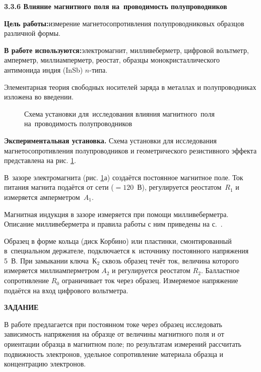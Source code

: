 {\large \bf 3.3.6 Влияние магнитного поля на~проводимость полупроводников}

{\bf Цель работы:}{измерение магнетосопротивления полупроводниковых образцов различной формы.}

{\bf В работе используются:}{электромагнит, милливеберметр, цифровой вольтметр, амперметр, миллиамперметр, реостат, образцы монокристаллического антимонида индия (InSb) $n$-типа.}

Элементарная теория свободных носителей заряда в металлах и полупроводниках изложена во введении.

\begin{figure}
\caption{Схема установки для~исследования влияния магнитного~поля на~проводимость полупроводников}
\label{fig3.6.1}
\end{figure}

{\bf Экспериментальная установка.} Схема установки для исследования магнетосопротивления полупроводников и геометрического резистивного эффекта представлена на рис. \ref{fig3.6.1}.

В~зазоре электромагнита (рис. \ref{fig3.6.1}а) создаётся постоянное магнитное поле. Ток питания магнита подаётся от сети (${=}120$~В), регулируется реостатом~$R_1$ и измеряется амперметром~$A_1$.

Магнитная индукция в зазоре измеряется при помощи милливеберметра. Описание милливеберметра и правила работы с ним приведены на с.~\pageref{MWB}.

Образец в форме кольца (диск Корбино) или пластинки, смонтированный в~специальном держателе, подключается к~источнику постоянного напряжения 5~В. При замыкании ключа~К$_2$ сквозь образец течёт ток, величина которого измеряется миллиамперметром $A_2$ и регулируется реостатом $R_2$. Балластное сопротивление $R_0$ ограничивает ток через образец. Измеряемое напряжение подаётся на вход цифрового вольтметра.

{\Large \bf ЗАДАНИЕ}

В работе предлагается при постоянном токе через образец исследовать зависимость напряжения на образце от величины магнитного поля и от ориентации образца в магнитном поле; по результатам измерений рассчитать подвижность электронов, удельное сопротивление материала образца и концентрацию электронов.

